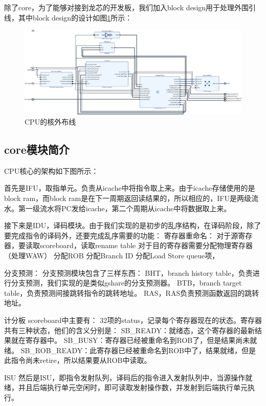 \documentclass[lang=cn,11pt,a4paper]{elegantpaper}
\begin{document}
除了core，为了能够对接到龙芯的开发板，我们加入block design用于处理外围引线，其中block design的设计如图\ref{fig:design_of_uncore}所示：

\begin{figure}[ht]
	\centering
	\includegraphics[width=\textwidth]{image/uncore.png}
	\caption{CPU的核外布线}\label{fig:design_of_uncore}
\end{figure}

\subsection{core模块简介}

CPU核心的架构如下图所示：

首先是IFU，取指单元。负责从icache中将指令取上来。由于icache存储使用的是block ram，而block ram是在下一周期返回读结果的，所以相应的，IFU是两级流水。第一级流水将PC发给icache，第二个周期从icache中将数据取上来。

接下来是IDU，译码模块。由于我们实现的是初步的乱序结构，在译码阶段，除了要完成指令的译码外，还要完成乱序需要的功能：
寄存器重命名：
对于源寄存器，要读取scoreboard，读取rename table
对于目的寄存器需要分配物理寄存器（处理WAW）
分配ROB
分配Branch ID
分配Load Store queue项，

分支预测：
分支预测模块包含了三样东西：
BHT，branch history table，负责进行分支预测，我们实现的是类似gshare的分支预测器。
BTB，branch target table，负责预测间接跳转指令的跳转地址。
RAS，RAS负责预测函数返回的跳转地址。

计分板
scoreboard中主要有：
32项的status，记录每个寄存器现在的状态。寄存器共有三种状态，他们的含义分别是：
SB\_READY：就绪态，这个寄存器的最新结果就在寄存器中。
SB\_BUSY：寄存器已经被重命名到ROB了，但是结果尚未就绪。
SB\_ROB\_READY：此寄存器已经被重命名到ROB中了，结果就绪，但是此指令尚未retire，所以结果要从ROB中读取。

ISU
然后是ISU，即指令发射队列，译码后的指令进入发射队列中，当源操作就绪，并且后端执行单元空闲时，即可读取发射操作数，并发射到后端执行单元执行。
\end{document}
